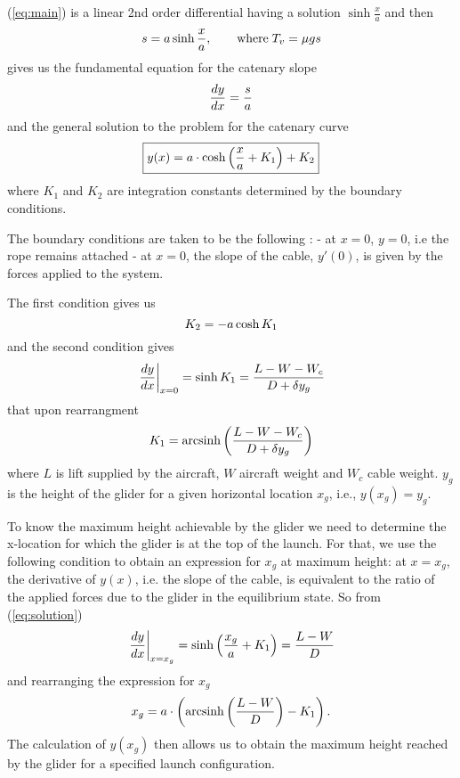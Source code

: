 \documentclass[11pt]{amsart}
\DeclareMathOperator{\arcsinh}{arcsinh}
\begin{document}
(\ref{eq:main}) is a linear 2nd order differential having a solution $\sinh{\frac{x}{a}}$ and 
then 
\begin{equation}
	\centering
	s = a \sinh{\frac{x}{a}}, \qquad \text{where} \; T_{v}=\mu g s
	\label{eq:s}
\end{equation}
gives us the fundamental equation for the catenary slope
\begin{equation}
	\centering
	\frac{dy}{dx} = \frac{s}{a}
	\label{eq:fundamental}
\end{equation}
and the general solution to the problem for the catenary curve
\begin{equation}
	\centering
	\boxed{y(x)=a \cdot \cosh \left(\frac{x}{a} + K_1 \right) + K_2}
	\label{eq:solution}
\end{equation}
where $K_1$ and $K_2$ are integration constants determined by the boundary conditions.

The boundary conditions are taken to be the following :\newline
- at $x=0$, $y=0$, i.e the rope remains attached \newline
- at $x=0$, the slope of the cable, $y\prime(0)$, is given by the forces applied to the system.

The first condition gives us
\begin{equation}
	\centering
	K_2 =-a \cosh{K_1}
	\label{eq:K2}
\end{equation}
and the second condition gives
\begin{equation}
	\centering
	\left. \frac{dy}{dx}\right|_{x=0} = \sinh{K_1} = \frac{L-W-W_c}{D + \delta y_g}
	\label{eq:bc1}
\end{equation}
that upon rearrangment
\begin{equation}
	\centering
	K_1 = \arcsinh \left(\frac{L-W-W_c}{D + \delta y_g}\right)
	\label{eq:K1}
\end{equation}
where $L$ is lift supplied by the aircraft, $W$ aircraft weight and $W_c$ cable weight. $y_g$ is the height of the glider for a given horizontal location $x_g$, i.e., $y(x_g)=y_g$. 

To know the maximum height achievable by the glider we need to determine the x-location for which the glider is at the top of the launch. For that, we use the following condition to obtain an expression for $x_g$ at maximum height: at $x=x_g$, the derivative of $y(x)$, i.e. the slope of the cable, is equivalent to the ratio of the applied forces due to the glider in the equilibrium state. So from (\ref{eq:solution})
\begin{equation}
	\centering
	\left. \frac{dy}{dx}\right|_{x=x_g}=\sinh\left(\frac{x_g}{a} + K_1 \right) = \frac{L-W}{D}
	\label{eq:bc2}
\end{equation}
and rearranging the expression for $x_g$ 
\begin{equation}
	\centering
	 x_g=a \cdot \left( \arcsinh \left(\frac{L-W}{D}\right) - K_1 \right).
	\label{eq:x_g}
\end{equation}
The calculation of $y(x_g)$ then allows us to obtain the maximum height reached by the glider for a specified launch configuration.
\end{document}
